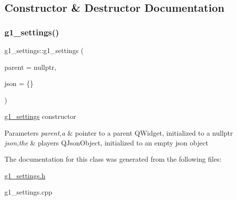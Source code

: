 \subsection{Constructor \& Destructor Documentation}
\mbox{\label{classg1__settings_a0528bafcafa9832b59f045b59e1ab260}} 
\subsubsection{\texorpdfstring{g1\+\_\+settings()}{g1\_settings()}}
{\footnotesize\ttfamily g1\+\_\+settings\+::g1\+\_\+settings (\begin{DoxyParamCaption}\item[{Q\+Widget $\ast$}]{parent = {\ttfamily nullptr},  }\item[{Q\+Json\+Object}]{json = {\ttfamily \{\}} }\end{DoxyParamCaption})\hspace{0.3cm}{\ttfamily [explicit]}}



\hyperlink{classg1__settings}{g1\+\_\+settings} constructor 


\begin{DoxyParams}{Parameters}
{\em parent,a} & pointer to a parent Q\+Widget, initialized to a nullptr \\
\hline
{\em json,the} & player\textquotesingle{}s Q\+Json\+Object, initialized to an empty json object \\
\hline
\end{DoxyParams}


The documentation for this class was generated from the following files\+:\begin{DoxyCompactItemize}
\item 
\hyperlink{g1__settings_8h}{g1\+\_\+settings.\+h}\item 
g1\+\_\+settings.\+cpp\end{DoxyCompactItemize}
